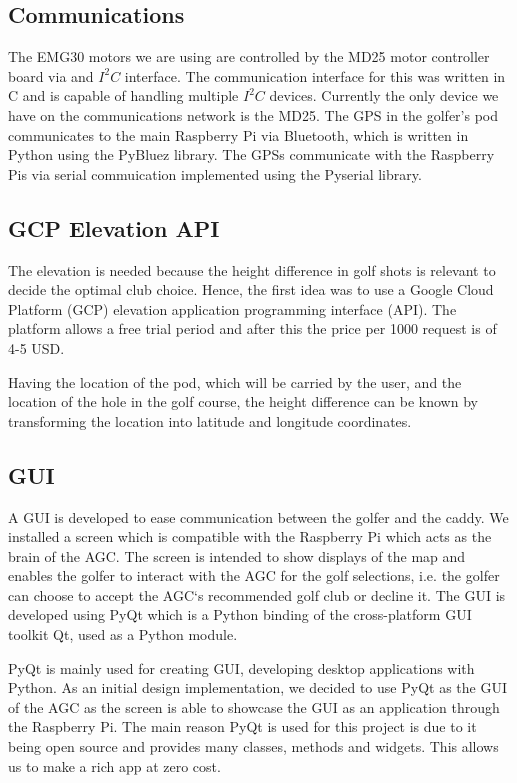 \documentclass[11pt,landscape]{article}
\begin{document}
\begin{multicols}{3}

\subsection{Communications}
The EMG30 motors we are using are controlled by the MD25 motor controller board
via and $I^2C$ interface. The communication interface for this was written in C
and is capable of handling multiple $I^2C$ devices. Currently the only device we
have on the communications network is the MD25. The GPS in the golfer's pod
communicates to the main Raspberry Pi via Bluetooth, which is written in Python
using the PyBluez library. The GPSs communicate with the Raspberry Pis via
serial commuication implemented using the Pyserial library.

\subsection{GCP Elevation API}
The elevation is needed because the height difference in golf shots is relevant
to decide the optimal club choice. Hence, the first idea was to use a Google
Cloud Platform (GCP) elevation application programming interface (API). The
platform allows a free trial period and after this the price per 1000 request is
of 4-5 USD. 

Having the location of the pod, which will be carried by the user, and the
location of the hole in the golf course, the height difference can be known by
transforming the location into latitude and longitude coordinates.


\subsection{GUI}

A GUI is developed to ease communication between the golfer and the caddy. We
installed a screen which is compatible with the Raspberry Pi which acts as the
brain of the AGC. The screen is intended to show displays of the map and enables
the golfer to interact with the AGC for the golf selections, i.e. the golfer can
choose to accept the AGC`s recommended golf club or decline it. The GUI is
developed using PyQt which is a Python binding of the cross-platform GUI toolkit
Qt, used as a Python module. 

 

PyQt is mainly used for creating GUI, developing desktop applications with
Python. As an initial design implementation, we decided to use PyQt as the GUI
of the AGC as the screen is able to showcase the GUI as an application through
the Raspberry Pi. The main reason PyQt is used for this project is due to it
being open source and provides many classes, methods and widgets. This allows us
to make a rich app at zero cost.  


\end{multicols}
\end{document}
